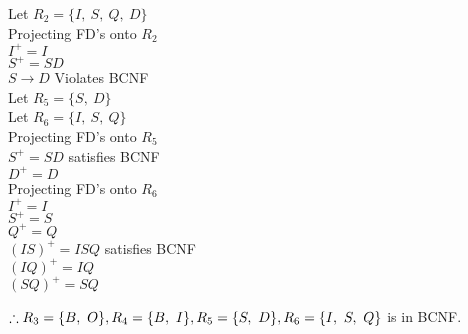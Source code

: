 \documentclass[12pt]{article}
\begin{document}
\begin{minipage}[t]{0.5\textwidth}
    Let $R_2 = \{I,\ S,\ Q,\ D\}$\\

    Projecting FD's onto $R_2$\\
    $I^+ = I$ \\
    $S^+ = SD$ \\
    $S \rightarrow D$ Violates BCNF\\

    Let $R_5 = \{S,\ D\}$\\
    Let $R_6 = \{I,\ S,\ Q\}$\\

    Projecting FD's onto $R_5$\\
    $S^+ = SD$ satisfies BCNF\\
    $D^+ = D$ \\

    Projecting FD's onto $R_6$\\
    $I ^+ = I$ \\
    $S ^+ = S$ \\
    $Q ^+ = Q$ \\
    $(IS) ^+ = ISQ$ satisfies BCNF\\
    $(IQ) ^+ = IQ$ \\
    $(SQ) ^+ = SQ$ \\
\end{minipage}

$\therefore R_3 = \{B,\ O\},\\ R_4 = \{B,\ I\},\\ R_5 = \{S,\ D\},\\ R_6 = \{I,\ S,\ Q\}$ is in BCNF.\\
\newpage
\end{document}
